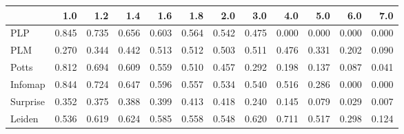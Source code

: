 \begin{tabular}{lrrrrrrrrrrr}
\toprule
{} &   1.0 &   1.2 &   1.4 &   1.6 &   1.8 &   2.0 &   3.0 &   4.0 &   5.0 &   6.0 &   7.0 \\
\midrule
PLP      & 0.845 & 0.735 & 0.656 & 0.603 & 0.564 & 0.542 & 0.475 & 0.000 & 0.000 & 0.000 & 0.000 \\
PLM      & 0.270 & 0.344 & 0.442 & 0.513 & 0.512 & 0.503 & 0.511 & 0.476 & 0.331 & 0.202 & 0.090 \\
Potts    & 0.812 & 0.694 & 0.609 & 0.559 & 0.510 & 0.457 & 0.292 & 0.198 & 0.137 & 0.087 & 0.041 \\
Infomap  & 0.844 & 0.724 & 0.647 & 0.596 & 0.557 & 0.534 & 0.540 & 0.516 & 0.286 & 0.000 & 0.000 \\
Surprise & 0.352 & 0.375 & 0.388 & 0.399 & 0.413 & 0.418 & 0.240 & 0.145 & 0.079 & 0.029 & 0.007 \\
Leiden   & 0.536 & 0.619 & 0.624 & 0.585 & 0.558 & 0.548 & 0.620 & 0.711 & 0.517 & 0.298 & 0.124 \\
\bottomrule
\end{tabular}
